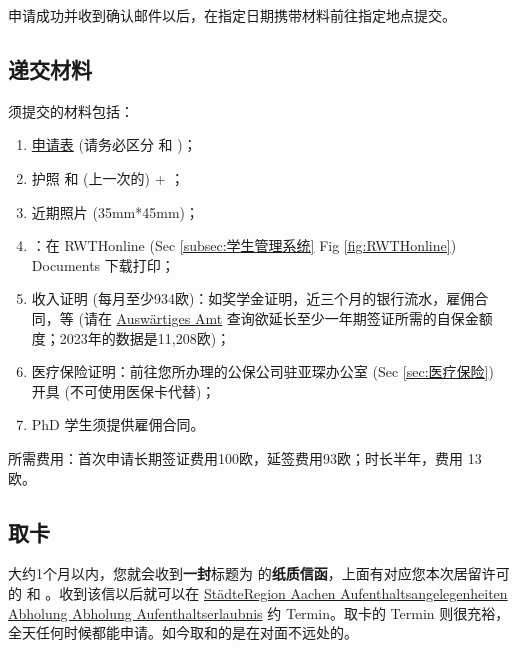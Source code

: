     申请成功并收到确认邮件以后，在指定日期携带材料前往指定地点提交。

  \subsection{递交材料}\label{subsec:递交材料}

    须提交的材料包括：
    \begin{enumerate}
      \item \href{https://bportal.staedteregion-aachen.de/staedteregion-a-z/-/egov-bis-detail/dienstleistung/15000/show}{申请表} (请务必区分 和 )；
      \item 护照 和 (上一次的)  + ；
      \item 近期照片 (35mm*45mm)；
      \item {}：在 RWTHonline (Sec \ref{subsec:学生管理系统} Fig \ref{fig:RWTHonline}) Documents 下载打印；
      \item 收入证明 (每月至少934欧)：如奖学金证明，近三个月的银行流水，雇佣合同，等 (请在 \href{https://www.auswaertiges-amt.de/de/sperrkonto/375488}{Auswärtiges Amt} 查询欲延长至少一年期签证所需的自保金额度；2023年的数据是11,208欧)；
      \item 医疗保险证明：前往您所办理的公保公司驻亚琛办公室 (Sec \ref{sec:医疗保险}) 开具 (不可使用医保卡代替)；
      \item PhD 学生须提供雇佣合同。
    \end{enumerate}
    所需费用：首次申请长期签证费用100欧，延签费用93欧；时长半年，费用 13 欧。

  \subsection{取卡}\label{subsec:取卡}

    大约1个月以内，您就会收到\textbf{一封}标题为  的\textbf{纸质信函}，上面有对应您本次居留许可的  和 。收到该信以后就可以在 \href{https://termine.staedteregion-aachen.de/auslaenderamt/}{StädteRegion Aachen \MVRightarrow{} Aufenthaltsangelegenheiten \MVRightarrow{}  Abholung \MVRightarrow{} Abholung Aufenthaltserlaubnis} 约 Termin。取卡的 Termin 则很充裕，全天任何时候都能申请。如今取和的是在对面不远处的。

